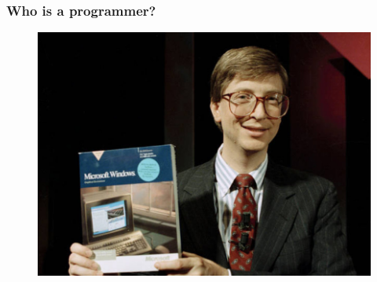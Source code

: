 \documentclass[handout]{beamer}
\begin{document}
\begin{frame}
\frametitle{Who is a programmer?}
\large




\begin{figure}
\includegraphics[scale=0.9]{gates.jpg}
\end{figure}
% 
% 
% 
% 

\end{frame}
\end{document}
